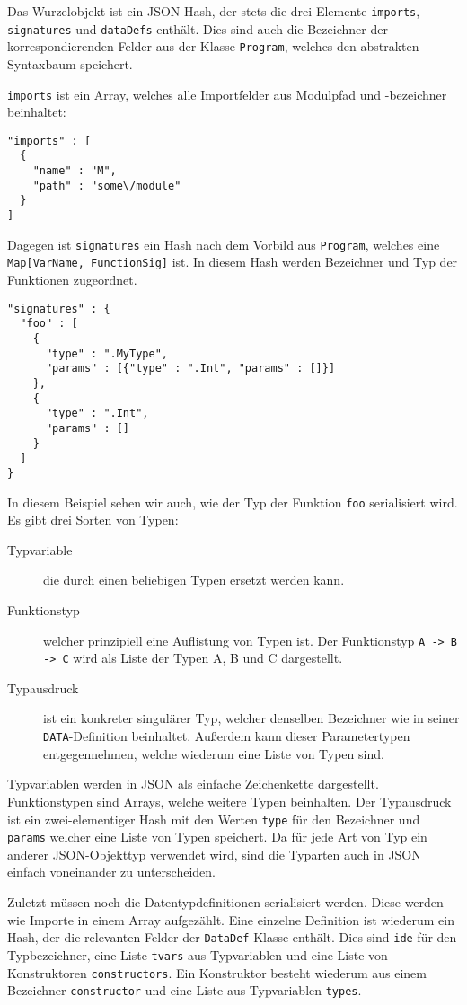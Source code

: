 \documentclass[runningheads]{llncs}
\begin{document}
Das Wurzelobjekt ist ein JSON-Hash, der stets die drei Elemente \verb|imports|, \verb|signatures| und \verb|dataDefs| enthält. Dies sind auch die Bezeichner der korrespondierenden Felder aus der Klasse \verb|Program|, welches den abstrakten Syntaxbaum speichert.

\verb|imports| ist ein Array, welches alle Importfelder aus Modulpfad und -bezeichner beinhaltet:

\begin{verbatim}
"imports" : [
  {
    "name" : "M",
    "path" : "some\/module"
  }
]
\end{verbatim}

Dagegen ist \verb|signatures| ein Hash nach dem Vorbild aus \verb|Program|, welches eine \verb|Map[VarName, FunctionSig]| ist. In diesem Hash werden Bezeichner und Typ der Funktionen zugeordnet.

\begin{verbatim}
"signatures" : {
  "foo" : [
    {
      "type" : ".MyType",
      "params" : [{"type" : ".Int", "params" : []}]
    },
    {
      "type" : ".Int",
      "params" : []
    }
  ]
}
\end{verbatim}

In diesem Beispiel sehen wir auch, wie der Typ der Funktion \verb|foo| serialisiert wird. Es gibt drei Sorten von Typen:

\begin{description}
 \item[Typvariable] die durch einen beliebigen Typen ersetzt werden kann.
 \item[Funktionstyp] welcher prinzipiell eine Auflistung von Typen ist. Der Funktionstyp \verb|A -> B -> C| wird als Liste der Typen A, B und C dargestellt.
 \item[Typausdruck] ist ein konkreter singulärer Typ, welcher denselben Bezeichner wie in seiner \verb|DATA|-Definition beinhaltet. Außerdem kann dieser Parametertypen entgegennehmen, welche wiederum eine Liste von Typen sind.
\end{description}

Typvariablen werden in JSON als einfache Zeichenkette dargestellt. Funktionstypen sind Arrays, welche weitere Typen beinhalten. Der Typausdruck ist ein zwei-elementiger Hash mit den Werten \verb|type| für den Bezeichner und \verb|params| welcher eine Liste von Typen speichert. Da für jede Art von Typ ein anderer JSON-Objekttyp verwendet wird, sind die Typarten auch in JSON einfach voneinander zu unterscheiden.

Zuletzt müssen noch die Datentypdefinitionen serialisiert werden. Diese werden wie Importe in einem Array aufgezählt. Eine einzelne Definition ist wiederum ein Hash, der die relevanten Felder der \verb|DataDef|-Klasse enthält. Dies sind \verb|ide| für den Typbezeichner, eine Liste \verb|tvars| aus Typvariablen und eine Liste von Konstruktoren \verb|constructors|. Ein Konstruktor besteht wiederum aus einem Bezeichner \verb|constructor| und eine Liste aus Typvariablen \verb|types|.
\end{document}
